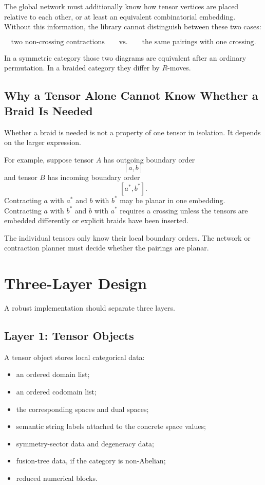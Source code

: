 \documentclass[11pt]{article}
\begin{document}
The global network must additionally know how tensor vertices are
placed relative to each other, or at least an equivalent combinatorial
embedding.  Without this information, the library cannot distinguish
between these two cases:

\[
  \text{two non-crossing contractions}
  \qquad\text{vs.}\qquad
  \text{the same pairings with one crossing}.
\]

In a symmetric category those two diagrams are equivalent after an
ordinary permutation.  In a braided category they differ by \(R\)-moves.

\subsection{Why a Tensor Alone Cannot Know Whether a Braid Is Needed}

Whether a braid is needed is not a property of one tensor in isolation.
It depends on the larger expression.

For example, suppose tensor \(A\) has outgoing boundary order
\[
  [a,b]
\]
and tensor \(B\) has incoming boundary order
\[
  [a^\ast,b^\ast].
\]
Contracting \(a\) with \(a^\ast\) and \(b\) with \(b^\ast\) may be
planar in one embedding.  Contracting \(a\) with \(b^\ast\) and \(b\)
with \(a^\ast\) requires a crossing unless the tensors are embedded
differently or explicit braids have been inserted.

The individual tensors only know their local boundary orders.  The
network or contraction planner must decide whether the pairings are
planar.

\section{Three-Layer Design}

A robust implementation should separate three layers.

\subsection{Layer 1: Tensor Objects}

A tensor object stores local categorical data:

\begin{itemize}
  \item an ordered domain list;
  \item an ordered codomain list;
  \item the corresponding spaces and dual spaces;
  \item semantic string labels attached to the concrete space values;
  \item symmetry-sector data and degeneracy data;
  \item fusion-tree data, if the category is non-Abelian;
  \item reduced numerical blocks.
\end{itemize}
\end{document}
